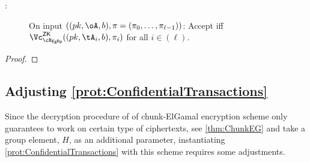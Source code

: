 \begin{description}
\begin{description}
\begin{description}
	 
	 	\item[\Vc:] On  input  $((\pk,\oA,b), \pi= (\pi_0,\ldots, \pi_{\ell-1}))$: Accept iff  $\vZK{\rEgRp}((\pk,\tA_i,b), \pi_i)$ for all $i\in (\ell)$.
	 
	 
\end{description}

\end{description}

\begin{proof}
\end{proof}
\end{description}


\subsection{Adjusting  \cref{prot:ConfidentialTransactions}}\label{sec:ChanksEg:Adjusting}
Since the decryption procedure of of chunk-ElGamal  encryption scheme only guarantees to work on certain type of ciphertexts, see \cref{thm:ChunkEG} and take a group element, \ie $H$, as an additional parameter,  instantiating \cref{prot:ConfidentialTransactions} with this scheme  requires some adjustments.

